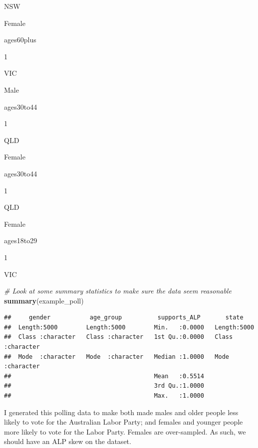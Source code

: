 \documentclass[
]{book}
\newenvironment{Shaded}{\begin{snugshade}}{\end{snugshade}}
\newcommand{\CommentTok}[1]{\textcolor[rgb]{0.56,0.35,0.01}{\textit{#1}}}
\newcommand{\DataTypeTok}[1]{\textcolor[rgb]{0.13,0.29,0.53}{#1}}
\newcommand{\KeywordTok}[1]{\textcolor[rgb]{0.13,0.29,0.53}{\textbf{#1}}}
\newcommand{\NormalTok}[1]{#1}
\newcommand{\OperatorTok}[1]{\textcolor[rgb]{0.81,0.36,0.00}{\textbf{#1}}}
\newcommand{\StringTok}[1]{\textcolor[rgb]{0.31,0.60,0.02}{#1}}
\begin{document}
NSW

Female

ages60plus

1

VIC

Male

ages30to44

1

QLD

Female

ages30to44

1

QLD

Female

ages18to29

1

VIC

\begin{Shaded}
\begin{Highlighting}[]
\CommentTok{# Look at some summary statistics to make sure the data seem reasonable}
\KeywordTok{summary}\NormalTok{(example_poll)}
\end{Highlighting}
\end{Shaded}

\begin{verbatim}
##     gender           age_group          supports_ALP       state          
##  Length:5000        Length:5000        Min.   :0.0000   Length:5000       
##  Class :character   Class :character   1st Qu.:0.0000   Class :character  
##  Mode  :character   Mode  :character   Median :1.0000   Mode  :character  
##                                        Mean   :0.5514                     
##                                        3rd Qu.:1.0000                     
##                                        Max.   :1.0000
\end{verbatim}

I generated this polling data to make both made males and older people less likely to vote for the Australian Labor Party; and females and younger people more likely to vote for the Labor Party. Females are over-sampled. As such, we should have an ALP skew on the dataset.

\begin{Shaded}
\end{Shaded}
\end{document}
